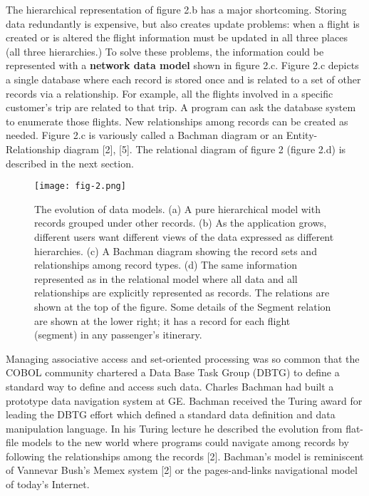 \documentclass[a4paper,12pt,notitlepage,twoside,openright]{article}
\begin{document}
The hierarchical representation of figure 2.b has a major shortcoming.
Storing data redundantly is expensive, but also creates update problems:
when a flight is created or is altered the flight information must be
updated in all three places (all three hierarchies.) To solve these
problems, the information could be represented with a \textbf{network
data model} shown in figure 2.c. Figure 2.c depicts a single database
where each record is stored once and is related to a set of other
records via a relationship. For example, all the flights involved in a
specific customer's trip are related to that trip. A program can ask the
database system to enumerate those flights. New relationships among
records can be created as needed. Figure 2.c is variously called a
Bachman diagram or an Entity-Relationship diagram {[}2{]}, {[}5{]}. The
relational diagram of figure 2 (figure 2.d) is described in the next
section.

\begin{figure}
  \centering
  \texttt{[image: fig-2.png]}
  \caption[The evolution of data models.]{The evolution of data models. (a) A pure hierarchical model
with records grouped under other records. (b) As the application grows,
different users want different views of the data expressed as different
hierarchies. (c) A Bachman diagram showing the record sets and
relationships among record types. (d) The same information represented
as in the relational model where all data and all relationships are
explicitly represented as records. The relations are shown at the top of
the figure. Some details of the Segment relation are shown at the lower
right; it has a record for each flight (segment) in any passenger's
itinerary.}
\end{figure}

Managing associative access and set-oriented processing was so common
that the COBOL community chartered a Data Base Task Group (DBTG) to
define a standard way to define and access such data. Charles Bachman
had built a prototype data navigation system at GE. Bachman received the
Turing award for leading the DBTG effort which defined a standard data
definition and data manipulation language. In his Turing lecture he
described the evolution from flat-file models to the new world where
programs could navigate among records by following the relationships
among the records {[}2{]}. Bachman's model is reminiscent of Vannevar
Bush's Memex system {[}2{]} or the pages-and-links navigational model of
today's Internet.
\end{document}
